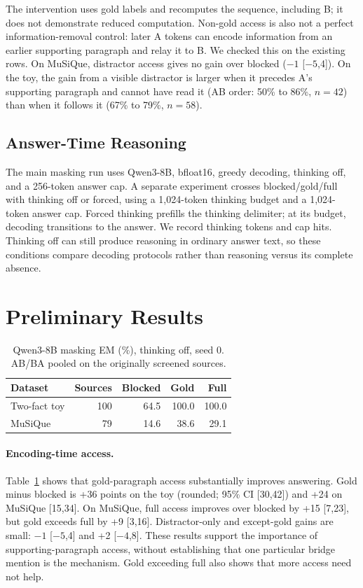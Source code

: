 \documentclass[sigconf,nonacm]{acmart}
\begin{document}
The intervention uses gold labels and recomputes the sequence, including B;
it does not demonstrate reduced computation. Non-gold access is also not a
perfect information-removal control: later A tokens can encode information
from an earlier supporting paragraph and relay it to B. We checked this on the existing rows. On MuSiQue, distractor access
gives no gain over blocked ($-1$ [$-5$,4]). On the toy, the gain from a visible
distractor is larger when it precedes A's supporting paragraph and cannot have
read it (AB order: 50\% to 86\%, $n=42$) than when it follows it
(67\% to 79\%, $n=58$).

\subsection{Answer-Time Reasoning}
The main masking run uses Qwen3-8B, bfloat16, greedy decoding, thinking off,
and a 256-token answer cap. A separate experiment crosses blocked/gold/full
with thinking off or forced, using a 1,024-token thinking budget and a
1,024-token answer cap. Forced thinking prefills the thinking delimiter;
at its budget, decoding transitions to the answer. We record thinking tokens
and cap hits. Thinking off can still produce reasoning in ordinary answer
text, so these conditions compare decoding protocols rather than reasoning
versus its complete absence.

\section{Preliminary Results}
\begin{table}[t]
\centering
\caption{Qwen3-8B masking EM (\%), thinking off, seed 0.
AB/BA pooled on the originally screened sources.}
\label{tab:masking}
\begin{tabular}{lrrrr}
\toprule
Dataset & Sources & Blocked & Gold & Full \\
\midrule
Two-fact toy & 100 & 64.5 & 100.0 & 100.0 \\
MuSiQue & 79 & 14.6 & 38.6 & 29.1 \\
\bottomrule
\end{tabular}
\end{table}

\paragraph{Encoding-time access.}
Table~\ref{tab:masking} shows that gold-paragraph access substantially
improves answering. Gold minus blocked is +36 points on the toy (rounded;
95\% CI [30,42]) and +24 on MuSiQue [15,34]. On MuSiQue, full access
improves over blocked by +15 [7,23], but gold exceeds full by +9 [3,16].
Distractor-only and except-gold gains are small: $-1$ [$-5$,4] and
+2 [$-4$,8]. These results support the importance of supporting-paragraph
access, without establishing that one particular bridge mention is the
mechanism. Gold exceeding full also shows that more access need not help.
\end{document}
